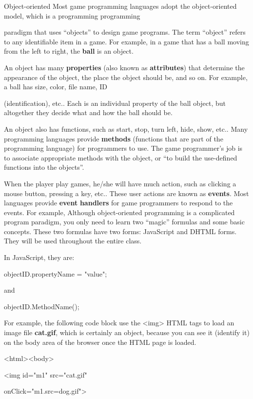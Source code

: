 \documentclass[
]{article}
\begin{document}
Object-oriented Most game programming languages adopt the
object-oriented model, which is a programming programming

paradigm that uses ``objects'' to design game programs. The term
``object'' refers to any identifiable item in a game. For example, in a
game that has a ball moving from the left to right, the \textbf{ball} is
an object.

An object has many \textbf{properties} (also known as
\textbf{attributes}) that determine the appearance of the object, the
place the object should be, and so on. For example, a ball has size,
color, file name, ID

(identification), etc.. Each is an individual property of the ball
object, but altogether they decide what and how the ball should be.

An object also has functions, such as start, stop, turn left, hide,
show, etc.. Many programming languages provide \textbf{methods}
(functions that are part of the programming language) for programmers to
use. The game programmer's job is to associate appropriate methods with
the object, or ``to build the use-defined functions into the objects''.

When the player play games, he/she will have much action, such as
clicking a mouse button, pressing a key, etc.. These user actions are
known as \textbf{events}. Most languages provide \textbf{event}
\textbf{handlers} for game programmers to respond to the events. For
example, Although object-oriented programming is a complicated program
paradigm, you only need to learn two ``magic'' formulas and some basic
concepts. These two formulas have two forms: JavaScript and DHTML forms.
They will be used throughout the entire class.

In JavaScript, they are:

objectID.propertyName = "value";

and

objectID.MethodName();

For example, the following code block use the
\textless img\textgreater{} HTML tags to load an image file
\textbf{cat.gif}, which is certainly an object, because you can see it
(identify it) on the body area of the browser once the HTML page is
loaded.

\textless html\textgreater\textless body\textgreater{}

\textless img id="m1" src="cat.gif"

onClick="m1.src=\textquotesingle dog.gif\textquotesingle"\textgreater{}
\end{document}
